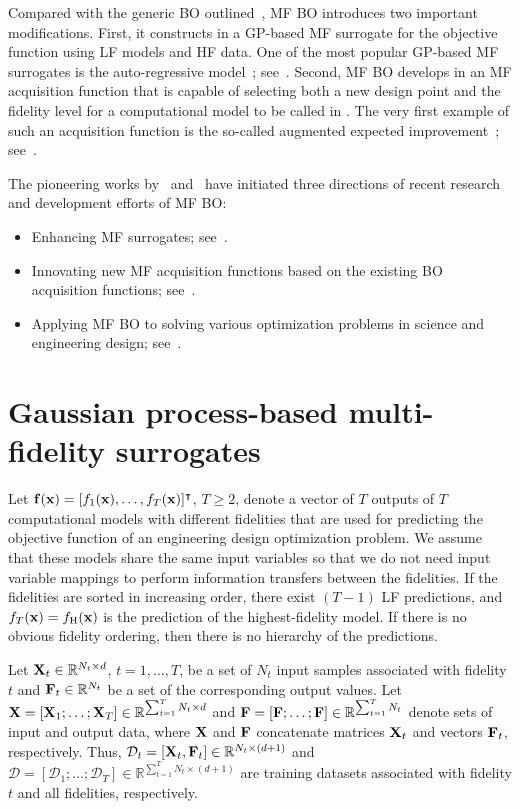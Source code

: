 \documentclass[journal ]{new-aiaa}
\newcommand{\edit}[1]{\textcolor{red!80!black}{#1}} %
\begin{document}
	Compared with the generic BO outlined~, MF BO introduces two important modifications.
	First, it constructs in  a GP-based MF surrogate for the objective function using LF models and HF data.
	One of the most popular GP-based MF surrogates is the auto-regressive model~\citep{Kennedy2000}; see~.
	Second, MF BO develops in  an MF acquisition function that is capable of selecting both a new design point and the fidelity level for a computational model to be called in .
	The very first example of such an acquisition function is the so-called augmented expected improvement~\citep{Huang2006smo}; see~. 
	
	The pioneering works by~\citet{Kennedy2000} and~\citet{Huang2006smo} have initiated three
	{directions}
	of recent research and development efforts of MF BO:
	\begin{itemize}
		\item Enhancing MF surrogates; see~.
		
		\item Innovating new MF acquisition functions based on the existing BO acquisition functions; see~.
		
		\item Applying MF BO to solving various optimization problems in science and engineering design; see~.	
	\end{itemize}
	
	\section{Gaussian process-based multi-fidelity surrogates}\label{Sec4}
	
	Let ${\bf f}({\bf x})=[f_1({\bf x}),\dots,f_T({\bf x})]^\intercal$, $T \geq 2$, denote a vector of $T$ outputs of $T$ computational models with different fidelities that are used for predicting the objective function of an engineering design optimization problem.
	We assume that these models share the same input variables so that we do not need input variable mappings to perform information transfers between the fidelities.
	If the fidelities are sorted in increasing order, there exist $(T-1)$ LF predictions, and $f_T({\bf x})=f_\text{H}({\bf x})$ is the prediction of the highest-fidelity model.
	If there is no obvious fidelity ordering, then there is no hierarchy of the predictions.
	
	Let ${\bf X}_{t}\in \mathbb{R}^{N_t \times d}$, $t=1,\dots,T$, be a set of $N_t$ input samples associated with fidelity $t$ and ${\bf F}_{t}\in \mathbb{R}^{N_t}$ be a set of the corresponding output values.
	Let ${\bf X}=[{\bf X}_1;\dots;{\bf X}_T] \in \mathbb{R}^{\sum_{t=1}^{T} N_t \times d}$ and ${\bf F}=[{\bf F};\dots;{\bf F}] \in \mathbb{R}^{\sum_{t=1}^{T} N_t}$ denote sets of input and output data, where ${\bf X}$ and ${\bf F}$ concatenate matrices ${\bf X}_t$ and vectors ${\bf F}_t$, respectively. 
	Thus, $\mathcal{D}_t=[{\bf X}_t,{\bf F}_t] \in \mathbb{R}^{N_t \times (d+1)}$ and $\mathcal{D}=[\mathcal{D}_1;\dots;\mathcal{D}_T] \in \mathbb{R}^{\sum_{t=1}^{T} N_t \times (d+1)}$ are training datasets associated with fidelity $t$ and all fidelities, respectively.
	
\end{document}
